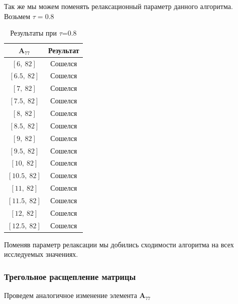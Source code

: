 \documentclass{article}
\begin{document}
        Так же мы можем поменять релаксационный параметр данного алгоритма. Возьмем $\tau = 0.8$
        
        
            \begin{table}[H]
			\centering
			\begin{tabular}{|c|c|}
				\hline
				$\textbf{A}_{77}$ & Результат\\
				
				\hline
				$[6, \ 82]$ & Сошелся \\
				
				\hline
				$[6.5, \ 82]$ & Сошелся \\
				
				\hline
				$[7, \ 82]$ & Сошелся \\
				
				\hline
				$[7.5, \ 82]$ & Сошелся \\
				
				\hline
				$[8, \ 82]$ & Сошелся \\
				
				\hline
				$[8.5, \ 82]$ & Сошелся \\
				
				\hline
				$[9, \ 82]$ & Сошелся \\
				
				\hline
				$[9.5, \ 82]$ & Сошелся \\
				
				\hline
				$[10, \ 82]$ & Сошелся \\
				
				\hline
				$[10.5, \ 82]$ & Сошелся \\
				
				\hline
				$[11, \ 82]$ & Сошелся \\
				
				\hline
				$[11.5, \ 82]$ & Сошелся \\
				
				\hline
				$[12, \ 82]$ & Сошелся \\
				
				\hline
				$[12.5, \ 82]$ & Сошелся \\

				\hline
				
			\end{tabular}
			\caption{Результаты при $\tau$=0.8}
		\end{table}
		
		Поменяв параметр релаксации мы добились сходимости алгоритма на всех исследуемых значениях.
		
	    \subsubsection{Трегольное расщепление матрицы}
	    Проведем аналогичное изменение элемента $\textbf{A}_{77}$
	    
\end{document}
